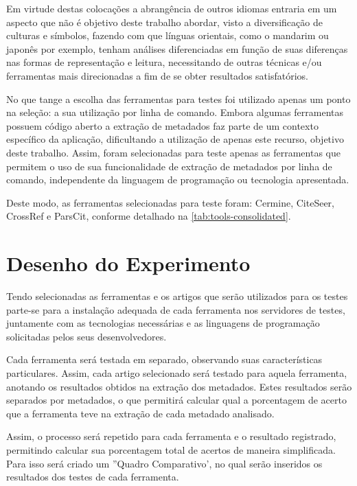 Em virtude destas colocações a abrangência de outros idiomas entraria em um aspecto que não é objetivo deste trabalho abordar, visto a diversificação de culturas e símbolos, fazendo com que línguas orientais, como o mandarim ou japonês por exemplo, tenham análises diferenciadas em função de suas diferenças nas formas de representação e leitura, necessitando de outras técnicas e/ou ferramentas mais direcionadas a fim de se obter resultados satisfatórios.

No que tange a escolha das ferramentas para testes foi utilizado apenas um ponto na seleção: a sua utilização por linha de comando. Embora algumas ferramentas possuem código aberto a extração de metadados faz parte de um contexto específico da aplicação, dificultando a utilização de apenas este recurso, objetivo deste trabalho. Assim, foram selecionadas para teste apenas as ferramentas que permitem o uso de sua funcionalidade de extração de metadados por linha de comando, independente da linguagem de programação ou tecnologia apresentada. 

Deste modo, as ferramentas selecionadas para teste foram: Cermine, CiteSeer, CrossRef e ParsCit, conforme detalhado na \autoref{tab:tools-consolidated}.
    

\section{Desenho do Experimento}
\label{sec:experiment-design}

Tendo selecionadas as ferramentas e os artigos que serão utilizados para os testes parte-se para a instalação adequada de cada ferramenta nos servidores de testes, juntamente com as tecnologias necessárias e as linguagens de programação solicitadas pelos seus desenvolvedores. 

Cada ferramenta será testada em separado, observando suas características particulares. Assim, cada artigo selecionado será testado para aquela ferramenta, anotando os resultados obtidos na extração dos metadados. Estes resultados serão separados por metadados, o que permitirá calcular qual a porcentagem de acerto que a ferramenta teve na extração de cada metadado analisado.

Assim, o processo será repetido para cada ferramenta e o resultado registrado, permitindo calcular sua porcentagem total de acertos de maneira simplificada. Para isso será criado um ''Quadro Comparativo', no qual serão inseridos os resultados dos testes de cada ferramenta. 

